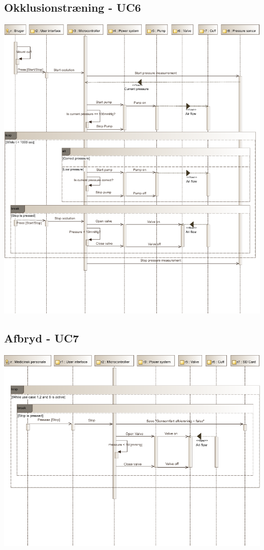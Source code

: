 \subsection{Okklusionstræning - UC6}
\includegraphics[width=\textwidth]{pdfs/SD_UC6-crop.pdf}

\subsection{Afbryd - UC7}
\includegraphics[width=\textwidth]{pdfs/SD_UC7-crop.pdf}

